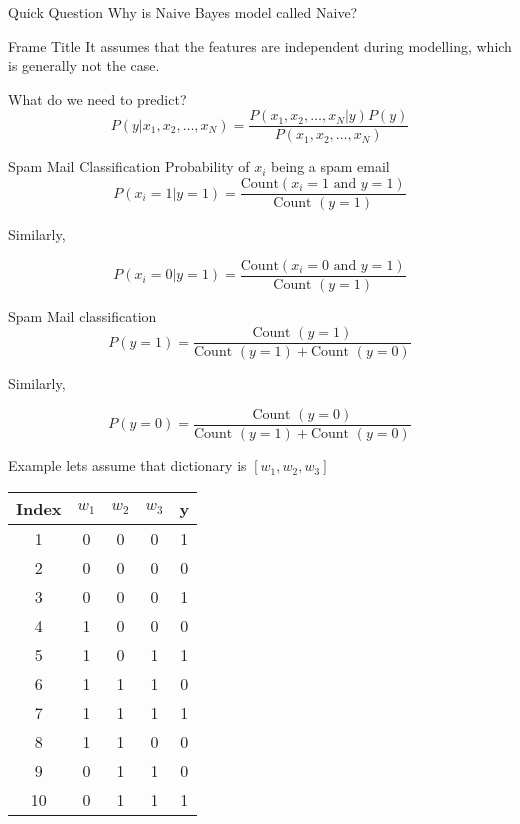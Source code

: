 \documentclass{beamer}
\begin{document}
\begin{frame}{Quick Question}
    Why is Naive Bayes model called Naive? 
\end{frame}


\begin{frame}{Frame Title}
    It assumes that the features are independent during modelling, which is generally not the case.
\end{frame}

\begin{frame}{What do we need to predict?}
    \begin{equation*}
        P(y|x_{1},x_{2},\dots,x_{N}) =  \frac{P(x_{1},x_{2},\dots,x_{N}|y)P(y)}{P(x_{1},x_{2},\dots,x_{N})}
    \end{equation*}
\end{frame}


\begin{frame}{Spam Mail Classification}
    Probability of $x_{i}$ being a spam email\\
    $$
    P(x_{i} = 1|y = 1) = \frac{\text{Count} (x_{i} = 1 \text{ and } y = 1)}{\text{Count }(y=1)}
    $$
    
    Similarly,
    
    $$
    P(x_{i} = 0|y = 1) = \frac{\text{Count} (x_{i} = 0 \text{ and } y = 1)}{\text{Count }(y=1)}
    $$
    
    
\end{frame}


\begin{frame}{Spam Mail classification}
    $$
        P(y = 1) = \frac{\text{Count }(y=1) }{\text{Count }(y=1) +\text{Count }(y=0) }
    $$
    
    Similarly,
    
    $$
        P(y = 0) = \frac{\text{Count }(y=0) }{\text{Count }(y=1) +\text{Count }(y=0) }
    $$
    
    
    
\end{frame}

\begin{frame}{Example}
    lets assume that dictionary is $[w_{1},w_{2},w_{3}]$
    
    
    \begin{tabular}{c|c|c|c|c}
    Index&$w_{1}$&$w_{2}$&$w_{3}$&y\\
    \hline
    \hline
         1 & 0 & 0 & 0 & 1  \\
         2 & 0 & 0 & 0 & 0  \\
         3 & 0 & 0 & 0 & 1  \\
         4 & 1 & 0 & 0 & 0  \\
         5 & 1 & 0 & 1 & 1  \\
         6 & 1 & 1 & 1 & 0  \\
         7 & 1 & 1 & 1 & 1  \\
         8 & 1 & 1 & 0 & 0  \\
         9 & 0 & 1 & 1 & 0  \\
         10 & 0 & 1 & 1 & 1  \\
    \end{tabular}
\end{frame}
\end{document}
